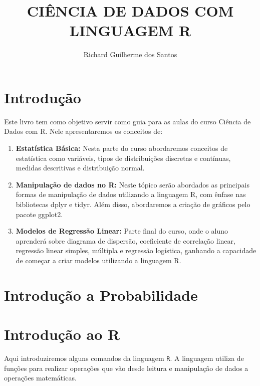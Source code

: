 \documentclass[
]{book}
\title{CIÊNCIA DE DADOS COM LINGUAGEM R}
\author{Richard Guilherme dos Santos}
\date{}
\providecommand{\tightlist}{%
  \setlength{\itemsep}{0pt}\setlength{\parskip}{0pt}}
\begin{document}
\maketitle

{
\setcounter{tocdepth}{1}
\tableofcontents
}
\hypertarget{introduuxe7uxe3o}{%
\chapter{Introdução}\label{introduuxe7uxe3o}}

Este livro tem como objetivo servir como guia para as aulas do curso Ciência de Dados com R. Nele apresentaremos os conceitos de:

\begin{enumerate}
\def\labelenumi{\arabic{enumi}.}
\tightlist
\item
  \textbf{Estatística Básica:} Nesta parte do curso abordaremos conceitos de estatística como variáveis, tipos de distribuições discretas e contínuas, medidas descritivas e distribuição normal.
\item
  \textbf{Manipulação de dados no R:} Neste tópico serão abordados as principais formas de manipulação de dados utilizando a linguagem R, com ênfase nas bibliotecas dplyr e tidyr. Além disso, abordaremos a criação de gráficos pelo pacote ggplot2.
\item
  \textbf{Modelos de Regressão Linear:} Parte final do curso, onde o aluno aprenderá sobre diagrama de dispersão, coeficiente de correlação linear, regressão linear simples, múltipla e regressão logística, ganhando a capacidade de começar a criar modelos utilizando a linguagem R.
\end{enumerate}

\hypertarget{introduuxe7uxe3o-a-probabilidade}{%
\chapter{Introdução a Probabilidade}\label{introduuxe7uxe3o-a-probabilidade}}

\hypertarget{introduuxe7uxe3o-ao-r}{%
\chapter{Introdução ao R}\label{introduuxe7uxe3o-ao-r}}

Aqui introduziremos alguns comandos da linguagem \texttt{R}. A linguagem utiliza de funções para realizar operações que vão desde leitura e manipulação de dados a operações matemáticas.
\end{document}
